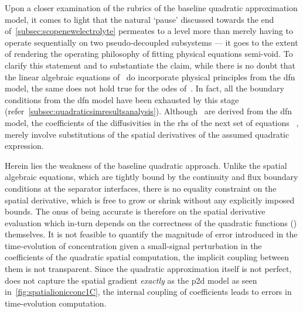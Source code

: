 Upon  a   closer  examination   of  the  rubrics   of  the   baseline  quadratic
approximation  model, it  comes  to  light that  the  natural `pause'  discussed
towards  the  end  of~\cref{subsec:scopenewelectrolyte}  permeates  to  a  level
more  than  merely  having  to  operate  sequentially  on  two  pseudo-decoupled
subsystems  --- it  goes to  the extent  of rendering  the operating  philosophy
of  fitting  physical  equations  semi-void.   To  clarify  this  statement  and
to  substantiate   the  claim,  while  there   is  no  doubt  that   the  linear
algebraic   equations  of~
do    incorporate    physical    principles   from    the    \gls{dfn}    model,
the     same     does     not      hold     true     for     the     \glspl{ode}
of~.   In  fact,
all   the   boundary   conditions   from   the   \gls{dfn}   model   have   been
exhausted   by  this   stage  (refer~\cref{subsec:quadraticsimresultsanalysis}).
Although~     are    derived
from     the      \gls{dfn}     model,      the     coefficients      of     the
diffusivities   in    the   \gls{rhs}   of    the   next   set    of   equations
\ie{}~,   merely
involve  substitutions  of the  spatial  derivatives  of the  assumed  quadratic
expression.

Herein lies the weakness of the  baseline quadratic approach. Unlike the spatial
algebraic equations, which are tightly bound by the continuity and flux boundary
conditions at the  separator interfaces, there is no equality  constraint on the
spatial  derivative, which  is free  to grow  or shrink  without any  explicitly
imposed  bounds.  The  onus  of  being accurate  is  therefore  on  the  spatial
derivative evaluation which in-turn depends  on the correctness of the quadratic
functions  () themselves.  It is
not feasible to quantify the magnitude of error introduced in the time-evolution
of concentration  given a small-signal  perturbation in the coefficients  of the
quadratic spatial  computation,\ie{} the implicit  coupling between them  is not
transparent. Since the quadratic approximation itself is not perfect, \ie{} does
not capture the  spatial gradient \emph{exactly} as the \gls{p2d}  model as seen
in~\cref{fig:spatialionicconc1C}, the internal coupling of coefficients leads to
errors in time-evolution computation.

